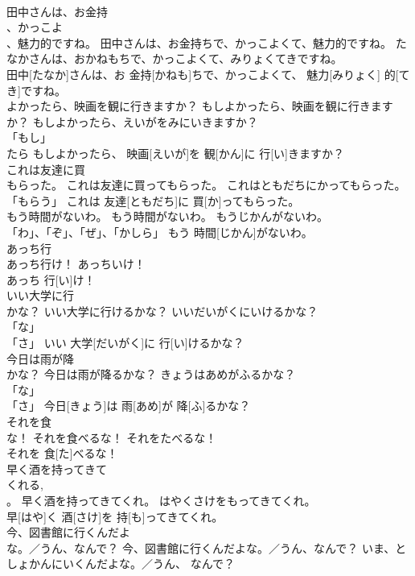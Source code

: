 \documentclass[8pt]{extreport}
\begin{document}
\begin{CJK}{UTF8}{min}
\\	田中さんは、お金持
\\	、かっこよ
\\	、魅力的ですね。	田中さんは、お金持ちで、かっこよくて、魅力的ですね。	たなかさんは、おかねもちで、かっこよくて、みりょくてきですね。	
\\	田中[たなか]さんは、お 金持[かねも]ちで、かっこよくて、 魅力[みりょく] 的[てき]ですね。		
\\	よかったら、映画を観に行きますか？	もしよかったら、映画を観に行きますか？	もしよかったら、えいがをみにいきますか？	
\\	「もし」 
\\	たら	もしよかったら、 映画[えいが]を 観[かん]に 行[い]きますか？		
\\	これは友達に買
\\	もらった。	これは友達に買ってもらった。	これはともだちにかってもらった。	
\\	「もらう」	これは 友達[ともだち]に 買[か]ってもらった。		
\\	もう時間がないわ。	もう時間がないわ。	もうじかんがないわ。	
\\	「わ」、「ぞ」、「ぜ」、「かしら」	もう 時間[じかん]がないわ。		
\\	あっち行
\\	あっち行け！	あっちいけ！	
\\	あっち 行[い]け！		
\\	いい大学に行
\\	かな？	いい大学に行けるかな？	いいだいがくにいけるかな？	
\\	「な」 
\\	「さ」	いい 大学[だいがく]に 行[い]けるかな？		
\\	今日は雨が降
\\	かな？	今日は雨が降るかな？	きょうはあめがふるかな？	
\\	「な」 
\\	「さ」	今日[きょう]は 雨[あめ]が 降[ふ]るかな？		
\\	それを食
\\	な！	それを食べるな！	それをたべるな！	
\\	それを 食[た]べるな！		
\\	早く酒を持ってきて
\\	くれる, 
\\	。	早く酒を持ってきてくれ。	はやくさけをもってきてくれ。	
\\	早[はや]く 酒[さけ]を 持[も]ってきてくれ。		
\\	今、図書館に行くんだよ
\\	な。／うん、なんで？	今、図書館に行くんだよな。／うん、なんで？	いま、としょかんにいくんだよな。／うん、 なんで？	

\end{CJK}
\end{document}
